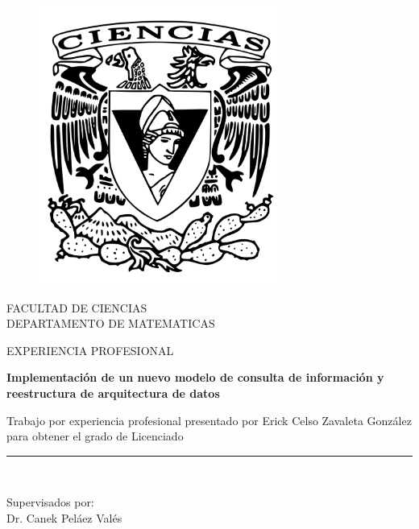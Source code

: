\documentclass[a4paper,openright,12pt]{book}
\begin{document}
\begin{titlepage}

\begin{center}
\vspace*{-1in}
\begin{figure}[htb]
\begin{center}
\includegraphics[width=8cm]{ciencias2}
\end{center}
\end{figure}

FACULTAD DE CIENCIAS\\
\vspace*{0.15in}
DEPARTAMENTO DE MATEMATICAS\\
\vspace*{0.6in}
\begin{large}
EXPERIENCIA PROFESIONAL\\
\end{large}
\vspace*{0.2in}
\begin{Large}
\textbf{Implementaci\'on de un nuevo modelo de consulta de informaci\'on y reestructura de arquitectura de datos} \\
\end{Large}
\vspace*{0.3in}
\begin{large}
Trabajo por experiencia profesional presentado por Erick Celso Zavaleta Gonz\'alez para obtener el grado de Licenciado \\
\end{large}
\vspace*{0.3in}
\rule{80mm}{0.1mm}\\
\vspace*{0.1in}
\begin{large}
Supervisados por: \\
Dr. Canek Pel\'aez Val\'es \\
\end{large}
\end{center}

\end{titlepage}
\end{document}
